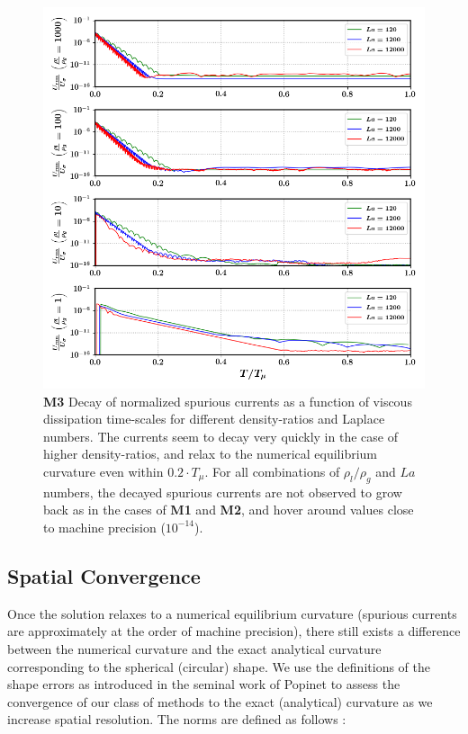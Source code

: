 \begin{figure}[h!]
    \centering
    \includegraphics[]{plots/static_drop/decay_sagar.png}
	\caption{\textbf{M3} Decay of normalized spurious currents as a function of viscous dissipation time-scales for different density-ratios and Laplace numbers. The currents seem to decay very quickly in the case of higher density-ratios, and relax to the numerical equilibrium curvature even within $0.2 \cdot T_\mu$. For all combinations of $\rho_l / \rho_g$ and $La$ numbers, the decayed spurious currents are not observed to grow back as in the cases of \textbf{M1} and \textbf{M2}, and hover around values close to machine precision ($10^{-14}$).}   
    \label{decay_sagar}
\end{figure}



\subsection*{Spatial Convergence}

Once the solution relaxes to a numerical equilibrium curvature (spurious currents are approximately at the order of machine precision), there still exists a difference between the numerical curvature and the exact analytical curvature corresponding to the spherical (circular) shape. We use the definitions of the shape errors as introduced in the seminal work of Popinet \cite{popinet2009accurate} to assess the convergence of our class of methods to the exact (analytical) curvature as we increase spatial resolution. The norms are defined as follows :      

